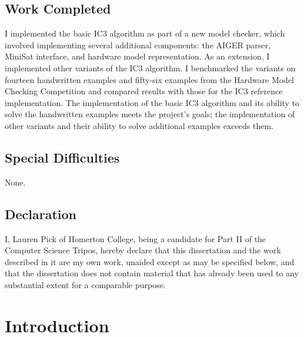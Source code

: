 \documentclass[12pt,a4paper,twoside,openright]{report}
\begin{document}
\section*{Work Completed}

I implemented the basic IC3 algorithm as part of a new model checker,
which involved implementing several additional components: the AIGER parser,
MiniSat interface, and hardware model representation.
As an extension, I implemented other variants of the IC3 algorithm.
I benchmarked the variants on fourteen handwritten examples and
fifty-six examples from the Hardware
Model Checking Competition and compared results with those for
the IC3 reference implementation. The implementation of
the basic IC3 algorithm and its ability to solve
the handwritten examples meets the project's goals;
the implementation of other variants and their ability to solve
additional examples exceeds them.

\section*{Special Difficulties}

None.
 
\newpage
\section*{Declaration}

I, Lauren Pick of Homerton College, being a candidate for Part II of the Computer
Science Tripos, hereby declare
that this dissertation and the work described in it are my own work,
unaided except as may be specified below, and that the dissertation
does not contain material that has already been used to any substantial
extent for a comparable purpose.

\bigskip
{}

\medskip
{}

\tableofcontents





\pagestyle{headings}

\chapter{Introduction}
\end{document}
